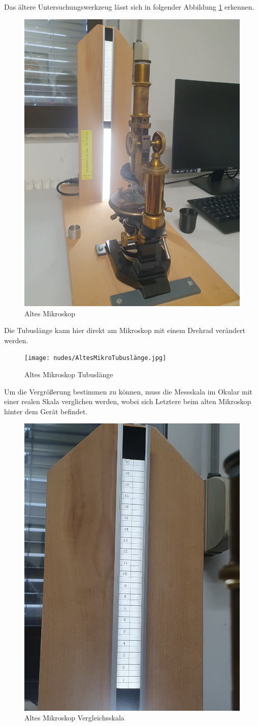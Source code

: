\documentclass[12pt,a4paper,twoside]{article}
\begin{document}
    Das ältere Untersuchungswerkzeug lässt sich in folgender Abbildung \ref{fig:Altes Mikroskop} erkennen.  

    \begin{figure}[H]
        \centering
        \includegraphics[width=0.5\linewidth, angle=-90]{nudes/AltesMikro.jpg}
        \caption{Altes Mikroskop}
        \label{fig:Altes Mikroskop}
    \end{figure}

    \noindent
    Die Tubuslänge kann hier direkt am Mikroskop mit einem Drehrad verändert werden.
    
    \begin{figure}[H]
        \centering
        \texttt{[image: nudes/AltesMikroTubuslänge.jpg]}
        \caption{Altes Mikroskop Tubuslänge}
        \label{fig:Altes Mikroskop Tubuslänge}
    \end{figure}

    \noindent
    Um die Vergrößerung bestimmen zu können, muss die Messskala im Okular mit einer realen Skala verglichen werden, wobei sich Letztere beim alten Mikroskop hinter dem Gerät befindet.

    \begin{figure}[H]
        \centering
        \includegraphics[width=0.5\linewidth, angle=-90]{nudes/AltesMikroMessskala.jpg}
        \caption{Altes Mikroskop Vergleichsskala}
        \label{fig:Altes Mikroskop Skala}
    \end{figure}
\end{document}
